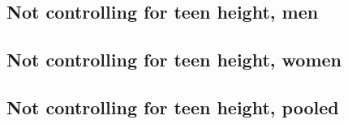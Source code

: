 \documentclass{article}
\begin{document}
\begin{landscape}
\subsection{Not controlling for teen height, men}

\end{landscape}

\begin{landscape}
\subsection{Not controlling for teen height, women}

\end{landscape}

\begin{landscape}
\subsection{Not controlling for teen height, pooled}

\end{landscape}


\iffalse



\fi

\begin{appendix}
	\listoffigures
	\listoftables	
\end{appendix}
\end{document}
